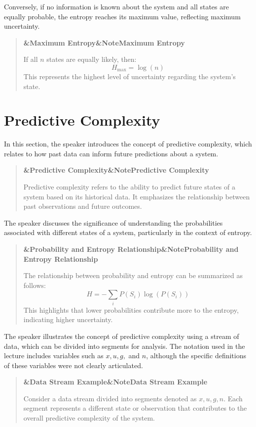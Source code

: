 \documentclass[a4paper]{article}
\newcommand{\boxheading}[1]{%
  \par\smallskip
  \noindent\textbf{\ifx&#1&Note\else#1\fi}\par
  \smallskip
}
\newenvironment{defbox}[1][]{%
  \begin{quote}\color{green!40!black}\boxheading{#1}\normalcolor
}{\end{quote}}
\newenvironment{exbox}[1][]{%
  \begin{quote}\color{brown!70!black}\boxheading{#1}\normalcolor
}{\end{quote}}
\newenvironment{rembox}[1][]{%
  \begin{quote}\color{black!70}\boxheading{#1}\normalcolor
}{\end{quote}}
\begin{document}
Conversely, if no information is known about the system and all states are equally probable, the entropy reaches its maximum value, reflecting maximum uncertainty.

\begin{defbox}[Maximum Entropy]
If all \( n \) states are equally likely, then:
\begin{equation}
H_{\text{max}} = \log(n)
\end{equation}
This represents the highest level of uncertainty regarding the system's state.
\end{defbox}

\section{Predictive Complexity}
In this section, the speaker introduces the concept of predictive complexity, which relates to how past data can inform future predictions about a system.

\begin{rembox}[Predictive Complexity]
Predictive complexity refers to the ability to predict future states of a system based on its historical data. It emphasizes the relationship between past observations and future outcomes.
\end{rembox}

The speaker discusses the significance of understanding the probabilities associated with different states of a system, particularly in the context of entropy.

\begin{defbox}[Probability and Entropy Relationship]
The relationship between probability and entropy can be summarized as follows:
\begin{equation}
H = -\sum_{i} P(S_i) \log(P(S_i))
\end{equation}
This highlights that lower probabilities contribute more to the entropy, indicating higher uncertainty.
\end{defbox}

The speaker illustrates the concept of predictive complexity using a stream of data, which can be divided into segments for analysis. The notation used in the lecture includes variables such as \( x, u, g, \) and \( n \), although the specific definitions of these variables were not clearly articulated.

\begin{exbox}[Data Stream Example]
Consider a data stream divided into segments denoted as \( x, u, g, n \). Each segment represents a different state or observation that contributes to the overall predictive complexity of the system.
\end{exbox}
\end{document}
